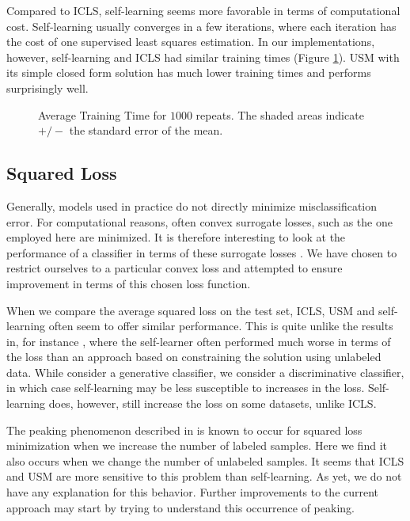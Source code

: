 \documentclass{elsarticle}
\begin{document}
Compared to ICLS, self-learning seems more favorable in terms of computational cost. Self-learning usually converges in a few iterations, where each iteration has the cost of one supervised least squares estimation. In our implementations, however, self-learning and ICLS had similar training times (Figure \ref{fig:timecurves}). USM with its simple closed form solution has much lower training times and performs surprisingly well.

\begin{figure}[t] 
  \centering
      \hspace*{-3.0cm}
      
  \caption{Average Training Time for $1000$ repeats. The shaded areas indicate $+/-$ the standard error of the mean.} \label{fig:timecurves}
\end{figure}

\subsection*{Squared Loss}
Generally, models used in practice do not directly minimize misclassification error. For computational reasons, often convex surrogate losses, such as the one employed here are minimized. It is therefore interesting to look at the performance of a classifier in terms of these surrogate losses \cite{Loog2016a}. We have chosen to restrict ourselves to a particular convex loss and attempted to ensure improvement in terms of this chosen loss function.

When we compare the average squared loss on the test set, ICLS, USM and self-learning often seem to offer similar performance. This is quite unlike the results in, for instance \cite{Loog2010,Loog2014b}, where the self-learner often performed much worse in terms of the loss than an approach based on constraining the solution using unlabeled data. While \cite{Loog2010,Loog2014b} consider a generative classifier, we consider a discriminative classifier, in which case self-learning may be less susceptible to increases in the loss. Self-learning does, however, still increase the loss on some datasets, unlike ICLS.

The peaking phenomenon described in \cite{Opper1996,Raudys1998} is known to occur for squared loss minimization when we increase the number of labeled samples. Here we find it also occurs when we change the number of unlabeled samples. It seems that ICLS and USM are more sensitive to this problem than self-learning. As yet, we do not have any explanation for this behavior. Further improvements to the current approach may start by trying to understand this occurrence of peaking.
\end{document}
